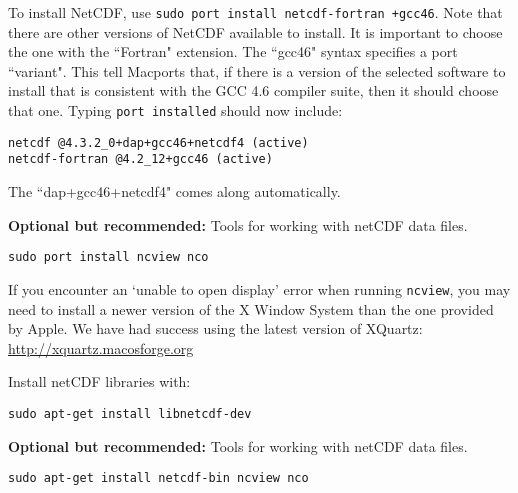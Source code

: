 \begin{mdframed}[style=mac] %
To install NetCDF, use \texttt{sudo port install netcdf-fortran +gcc46}. 
Note that there are other versions of NetCDF available to install. It is important 
to choose the one with the ``Fortran" extension. The ``gcc46" syntax specifies a port ``variant". 
This tell Macports that, if there is a version of the selected software 
to install that is consistent with the GCC 4.6 compiler suite, then it should 
choose that one. Typing \texttt{port installed} should now include:

\begin{verbatim}
netcdf @4.3.2_0+dap+gcc46+netcdf4 (active)
netcdf-fortran @4.2_12+gcc46 (active)
\end{verbatim}

The ``dap+gcc46+netcdf4" comes along automatically. 

\textbf{Optional but recommended:} Tools for working with netCDF data files.

\texttt{sudo port install ncview nco}

If you encounter an `unable to open display' error when running \texttt{ncview},
you may need to install a newer version of the X Window System than the one provided by Apple.
We have had success using the latest version of XQuartz:
\href{http://xquartz.macosforge.org}{http://xquartz.macosforge.org}

\end{mdframed}              %


\begin{mdframed}[style=ubuntu] %
Install netCDF libraries with:

\texttt{sudo apt-get install libnetcdf-dev}

\textbf{Optional but recommended:} Tools for working with netCDF data files.

\texttt{sudo apt-get install netcdf-bin ncview nco}
\end{mdframed}                 %



